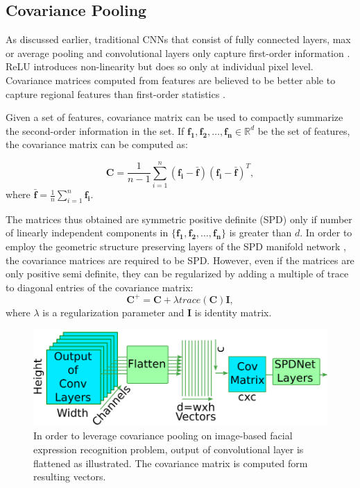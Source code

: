 \documentclass[10pt,twocolumn,letterpaper]{article}
\begin{document}
\subsection{Covariance Pooling}
As discussed earlier, traditional CNNs that consist of fully connected layers, max or average pooling and convolutional layers only capture first-order information \cite{epfl}. ReLU introduces non-linearity but does so only at individual pixel level. Covariance matrices computed from features are believed to be better able to capture regional features than first-order statistics \cite{cdu}.
		
Given a set of features, covariance matrix can be used to compactly summarize the second-order information in the set. If $\mathbf{f_1},\mathbf{f_2},\dots,\mathbf{f_n}\in\mathbb{R}^d$ be the set of features, the covariance matrix can be computed as:
	
		\begin{equation}
	    	\label{eqn:1}
		    \mathbf{C}=\frac{1}{n-1}\sum_{i=1}^n(\mathbf{f_i}-\mathbf{\bar{f}})(\mathbf{f_i}-\mathbf{\bar{f}})^T,
		\end{equation}
	where $\mathbf{\bar{f}}=\frac{1}{n}\sum_{i=1}^n\mathbf{f_i}$.

	The matrices thus obtained are symmetric positive definite (SPD) only if number of linearly independent components in $\{\mathbf{f_1},\mathbf{f_2},\dots,\mathbf{f_n}\}$ is greater than $d$. In order to employ the geometric structure preserving layers of the SPD manifold network \cite{spdnet}, the covariance matrices are required to be SPD. However, even if the matrices are only positive semi definite, they can be regularized by adding a multiple of trace to diagonal entries of the covariance matrix:
		\begin{equation}
		\label{eqn:2}
		    \mathbf{C^+}=\mathbf{C}+\lambda trace(\mathbf{C})\mathbf{I},
		\end{equation}
	where $\lambda$ is a regularization parameter and $\mathbf{I}$ is identity matrix.
	
		\begin{figure}
		\begin{center}
			\includegraphics[width=.95\linewidth,keepaspectratio]{res/imageCovMatrix}
		\end{center}
		\caption{In order to leverage covariance pooling on image-based facial expression recognition problem, output of convolutional layer is flattened as illustrated. The covariance matrix is computed form resulting vectors.}
		\label{fig:imageCovMatrix}
	\end{figure}
	
\end{document}
